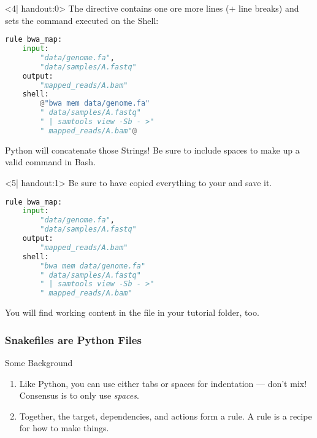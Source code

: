 \begin{frame}[fragile]
  \begin{onlyenv}<4| handout:0>
   The  directive contains one ore more lines ($+$ line breaks) and sets the command executed on the Shell:
  \begin{lstlisting}[language=Python,style=Python]
rule bwa_map:
    input:
        "data/genome.fa",
        "data/samples/A.fastq"
    output:
        "mapped_reads/A.bam"
    shell:
        @"bwa mem data/genome.fa"
        " data/samples/A.fastq"
        " | samtools view -Sb - >"
        " mapped_reads/A.bam"@
    \end{lstlisting}
    \bcattention Python will concatenate those Strings! Be sure to include spaces to make up a valid command in Bash.
  \end{onlyenv}
  \begin{onlyenv}<5| handout:1>
   Be sure to have copied everything to your  and save it.
   \begin{lstlisting}[language=Python,style=Python]
rule bwa_map:
    input:
        "data/genome.fa",
        "data/samples/A.fastq"
    output:
        "mapped_reads/A.bam"
    shell:
        "bwa mem data/genome.fa"
        " data/samples/A.fastq"
        " | samtools view -Sb - >"
        " mapped_reads/A.bam"
    \end{lstlisting}
    You will find working content in the file  in your tutorial folder, too.
  \end{onlyenv}
\end{frame}

\begin{frame}
  \frametitle{Snakefiles are Python Files}
  \begin{block}{Some Background}
     \begin{enumerate}[<+->]
       \item Like Python, you can use either tabs or spaces for indentation — don’t mix! Consensus is to only use \emph{spaces}.
       \item Together, the target, dependencies, and actions form a rule. A rule is a recipe for how to make things.
  \end{enumerate}
  \end{block}
\end{frame}

